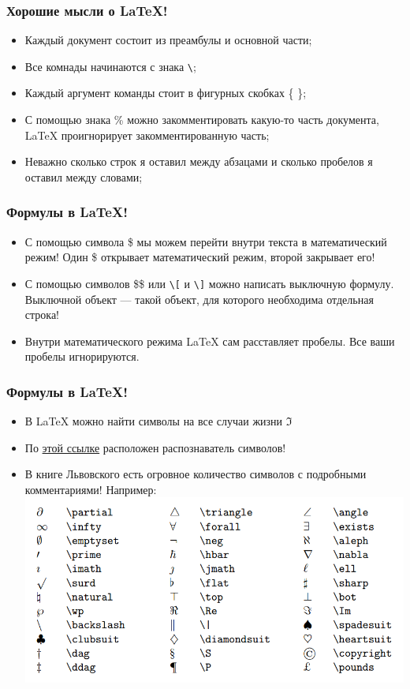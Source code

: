 \documentclass[newPxFont]{beamer}
\begin{document}
\begin{frame}[fragile]
\frametitle{Хорошие мысли о \LaTeX!} 
\begin{itemize}
\item Каждый документ состоит из преамбулы и основной части;
\item Все \alert{комнады} начинаются с знака \verb|\|;
\item Каждый аргумент команды стоит в фигурных скобках \{ \};
\item С помощью знака \% можно закомментировать какую-то часть документа, \LaTeX{} проигнорирует закомментированную часть;
\item Неважно сколько строк я оставил между абзацами и сколько пробелов я оставил между словами; 
\end{itemize}
\end{frame}


\begin{frame}[fragile]
\frametitle{Формулы в \LaTeX!} 
\begin{itemize}
\item С помощью символа \$ мы можем перейти внутри текста в математический режим! Один \$ открывает математический режим, второй закрывает его! 
\item С помощью символов \$\$ или \verb|\[| и \verb|\]| можно написать выключную формулу. Выключной объект --- такой объект, для которого необходима отдельная строка!
\item Внутри математического режима \LaTeX{} сам расставляет пробелы. Все ваши пробелы игнорируются.
\end{itemize}
\end{frame}


\begin{frame}
\frametitle{Формулы в \LaTeX!} 
\begin{itemize}
\item В \LaTeX{} можно найти символы на все случаи жизни $\Im$
\item По {\color{blue} \href{http://detexify.kirelabs.org/classify.html}{этой ссылке}} расположен распознаватель символов!
\item В книге Львовского есть огровное количество символов с подробными комментариями! Например: 
\centering  \includegraphics[scale=0.2]{table.png}
\end{itemize}
\end{frame}
\end{document}
